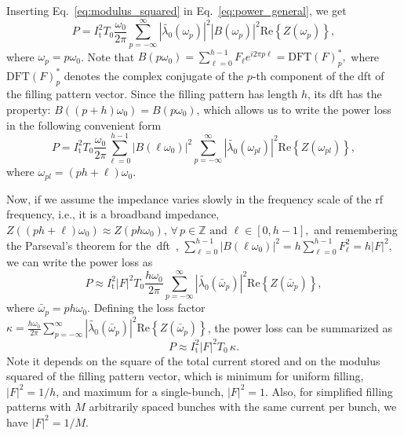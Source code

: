 \documentclass
[
    a4paper,
]{jacow}
\providecommand{\Real}[1]{\ensuremath{\mathrm{Re}\left\{#1\right\}}}
\begin{document}
    Inserting Eq.~\eqref{eq:modulus_squared} in Eq.~\eqref{eq:power_general}, we get
    \begin{equation}
        P = I_\mathrm{t}^2T_0 \frac{\omega_0}{2\pi}\sum_{p=-\infty}^{\infty} \left|\tilde{\lambda_0}(\omega_p)\right|^2 \left|B(\omega_p)\right|^2\Real{Z(\omega_p)},
    \end{equation}
    where $\omega_p = p\omega_0$. Note that
    $
        B(p\omega_0) = \sum_{\ell=0}^{h-1}F_\ell e^{i2\pi p\ell} = \mathrm{DFT}(F)^*_p,
    $
    where $\mathrm{DFT}(F)^*_p$ denotes the complex conjugate of the $p$-th component of the \gls{dft} of the filling pattern vector. Since the filling pattern has length $h$, its \gls{dft} has the property:
    $
        B((p+h)\omega_0) = B(p\omega_0)
    $,
    which allows us to write the power loss in the following convenient form
    \begin{equation}
        P = I_\mathrm{t}^2T_0 \frac{\omega_0}{2\pi}\sum_{\ell=0}^{h-1} \left|B(\ell\omega_0)\right|^2\sum_{p=-\infty}^{\infty} \left|\tilde{\lambda_0}(\omega_{pl})\right|^2 \Real{Z(\omega_{pl})},
    \end{equation}
    where $\omega_{pl} = (ph+\ell)\omega_0$.
    
    Now, if we assume the impedance varies slowly in the frequency scale of the rf frequency, i.e., it is a broadband impedance,
    $
        Z((ph+\ell)\omega_0) \approx Z(ph\omega_0), \, \forall\, p \in\mathbb{Z}\,\,\mathrm{and}\,\, \ell \in[0,h-1],
    $
    and remembering the Parseval's theorem for the~\gls{dft}~\cite{Wikipedia_DFT},
    $
        \sum_{\ell=0}^{h-1} \left|B(\ell\omega_0)\right|^2 = h\sum_{\ell=0}^{h-1} F_\ell^2 = h|F|^2,
    $
    we can write the power loss as
    \begin{equation}
        P \approx I_\mathrm{t}^2 \left|F\right|^2 T_0 \frac{h\omega_0}{2\pi}\sum_{p=-\infty}^{\infty} \left|\tilde{\lambda_0}(\bar{\omega}_p)\right|^2 \Real{Z(\bar{\omega}_p)},
    \end{equation}
    where $\bar{\omega}_p = ph\omega_0$. Defining the loss factor
    $
        \kappa = \frac{h\omega_0}{2\pi}\sum_{p=-\infty}^{\infty} \left|\tilde{\lambda_0}(\bar{\omega}_p)\right|^2 \Real{Z(\bar{\omega}_p)}
    $,
    the power loss can be summarized as
    \begin{equation}\label{eq:power_broadband}
        P \approx I_\mathrm{t}^2 \left|F\right|^2 T_0\, \kappa.
    \end{equation}
    Note it depends on the square of the total current stored and on the modulus squared of the filling pattern vector, which is minimum for uniform filling, $|F|^2=1/h$, and maximum for a single-bunch, $|F|^2=1$. Also, for simplified filling patterns with $M$ arbitrarily spaced bunches with the same current per bunch, we have $|F|^2=1/M$.
\end{document}
